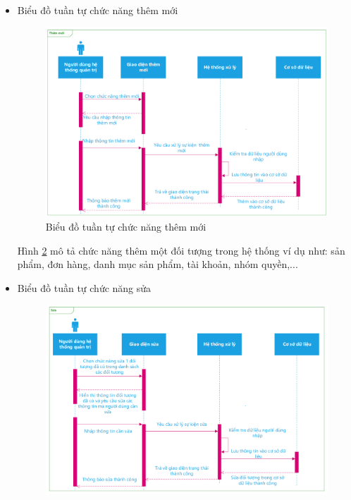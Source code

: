 \begin{itemize}
\begin{center}
\begin{figure}[h]
\begin{center}
    \end{center}
    \caption{Biểu đồ tuần tự chức năng đăng xuất}
    \label{refhinh3_7}
    \end{figure}
\end{center}
Hình \ref{refhinh3_7} mô tả chức năng đăng xuất khi người sử dụng hệ thống không làm việc hoặc ở trạng thái nghỉ đảm bảo tính bảo mật dữ liệu cho hệ thống.
\newpage
\item Biểu đồ tuần tự chức năng thêm mới
\begin{center}
    \begin{figure}[h]
    \begin{center}
     \includegraphics[scale=0.65]{image/SquenceDiagramTM.pdf}
    \end{center}
    \caption{Biểu đồ tuần tự chức năng thêm mới}
    \label{refhinh3_8}
    \end{figure}
\end{center}
Hình \ref{refhinh3_8} mô tả chức năng thêm một đối tượng trong hệ thống ví dụ như: sản phẩm, đơn hàng, danh mục sản phẩm, tài khoản, nhóm quyền,...
\newpage
\item Biểu đồ tuần tự chức năng sửa
\begin{center}
    \begin{figure}[h]
    \begin{center}
     \includegraphics[scale=0.65]{image/SquenceDiagramS.pdf}

\end{center}
\end{figure}
\end{center}
\end{itemize}
